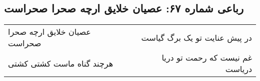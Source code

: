 \begin{center}
\section*{رباعی شماره ۶۷: عصیان خلایق ارچه صحرا صحراست}
\label{sec:sh067}
\begin{longtable}{l p{0.5cm} r}
عصیان خلایق ارچه صحرا صحراست
&&
در پیش عنایت تو یک برگ گیاست
\\
هرچند گناه ماست کشتی کشتی
&&
غم نیست که رحمت تو دریا دریاست
\\
\end{longtable}
\end{center}
